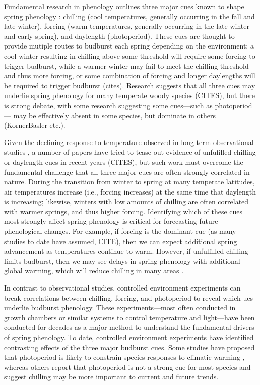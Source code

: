 \documentclass[11pt,letter]{article}
\begin{document}
\par Fundamental research in phenology outlines three major cues known to shape spring phenology \citep{chuineJTB}: chilling (cool temperatures, generally occurring in the fall and late winter), forcing (warm temperatures, generally occurring in the late winter and early spring), and daylength (photoperiod). These cues are thought to provide mutiple routes to budburst each spring depending on the environment: a cool winter resulting in chilling above some threshold will require some forcing to trigger budburst, while a warmer winter may fail to meet the chilling threshold and thus more forcing, or some combination of forcing and longer daylengths will be required to trigger budburst (cites). Research suggests that all three cues may underlie spring phenology for many temperate woody species (CITES), but there is strong debate, with some research suggesting some cues---such as photoperiod--- may be effectively absent in some species, but dominate in others (KornerBasler etc.). 

\par Given the declining response to temperature observed in long-term observational studies \citep{fu2015}, a number of papers have tried to tease out evidence of unfufilled chilling or daylength cues in recent years (CITES), but such work must overcome the fundamental challenge that all three major cues are often strongly correlated in nature. During the transition from winter to spring at many temperate latitudes, air temperatures increase (i.e., forcing increases) at the same time that daylength is increasing; likewise, winters with low amounts of chilling are often correlated with warmer springs, and thus higher forcing.  Identifying which of these cues most strongly affect spring phenology is critical for forecasting future phenological changes. For example, if forcing is the dominant cue (as many studies to date have assumed, CITE), then we can expect additional spring advancement as temperatures continue to warm. However, if unfulfilled chilling limits budburst, then we may see delays in spring phenology with additional global warming, which will reduce chilling in many areas \citep{fraga2019}. %

\par In contrast to observational studies, controlled environment experiments can break correlations between chilling, forcing, and photoperiod to reveal which ues underlie budburst phenology. These experiments---most often conducted in growth chambers or similar systems to control temperature and light---have been conducted for decades as a major method to understand the fundamental drivers of spring phenology. To date, controlled environment experiments have identified contrasting effects of the three major budburst cues. Some studies have proposed that photoperiod is likely to constrain species responses to climatic warming \citep{Basler:2012, Caffarra:2011b,Caffarra:2011a}, whereas others report that photoperiod is not a strong cue for most species \citep{zohner2016,Laube:2014a} and suggest chilling may be more important to current and future trends. 
\end{document}
